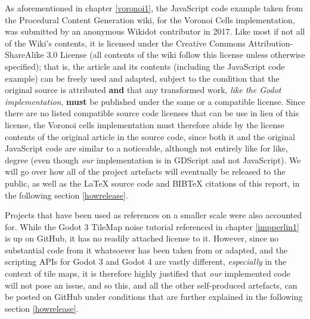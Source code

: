 As aforementioned in chapter \ref{voronoi1}, the JavaScript code example taken from the Procedural Content Generation wiki\cite{pcgwikivoronoi}, for the Voronoi Cells implementation, was submitted by an anonymous Wikidot contributor in 2017. Like most if not all of the Wiki's contents, it is licensed under the Creative Commons Attribution-ShareAlike 3.0 License (all contents of the wiki follow this license unless otherwise specified); that is, the article and its contents (including the JavaScript code example) can be freely used and adapted, subject to the condition that the original source is attributed \textbf{and} that any transformed work, \textit{like the Godot implementation}, \textbf{must} be published under the same or a compatible license.\cite{cc_at_sa_3} Since there are no listed compatible source code licenses that can be use in lieu of this license\cite{cc_compat}, the Voronoi cells implementation must therefore abide by the license contents of the original article in the source code, since both it and the original JavaScript code are similar to a noticeable, although not entirely like for like, degree (even though \textit{our} implementation is in GDScript and not JavaScript). We will go over how all of the project artefacts will eventually be released to the public, as well as the \LaTeX{} source code and BIB\TeX{} citations of this report, in the following section \ref{howrelease}.

Projects that have been used as references on a smaller scale were also accounted for. While the Godot 3 TileMap noise tutorial referenced in chapter \ref{impperlin1} is up on GitHub, it has no readily attached license to it.\cite{gingergd3tutorialGH} However, since no substantial code from it whatsoever has been taken from or adapted, and the scripting APIs for Godot 3 and Godot 4 are vastly different, \textit{especially} in the context of tile maps, it is therefore highly justified that \textit{our} implemented code will not pose an issue, and so this, and all the other self-produced artefacts, can be posted on GitHub under conditions that are further explained in the following section \ref{howrelease}.

